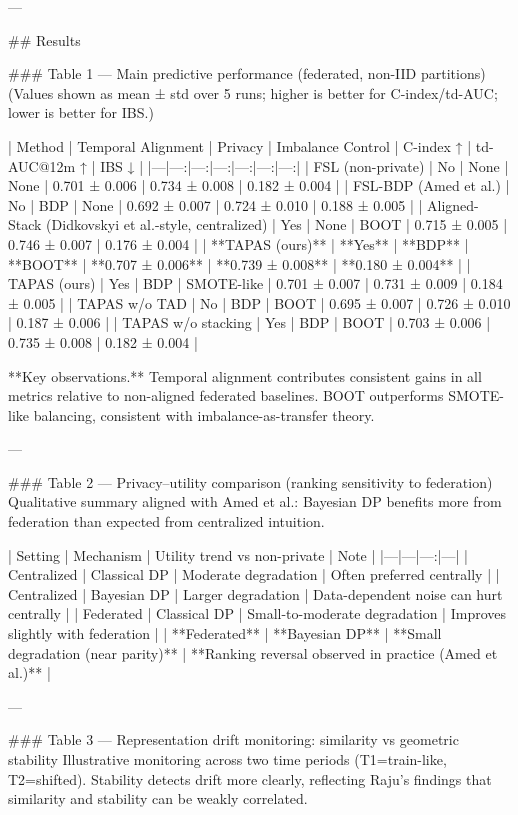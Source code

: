 ---

## Results  

### Table 1 — Main predictive performance (federated, non-IID partitions)  
(Values shown as mean ± std over 5 runs; higher is better for C-index/td-AUC; lower is better for IBS.)

| Method | Temporal Alignment | Privacy | Imbalance Control | C-index ↑ | td-AUC@12m ↑ | IBS ↓ |
|---|---:|---:|---:|---:|---:|---:|
| FSL (non-private) | No | None | None | 0.701 ± 0.006 | 0.734 ± 0.008 | 0.182 ± 0.004 |
| FSL-BDP (Amed et al.) | No | BDP | None | 0.692 ± 0.007 | 0.724 ± 0.010 | 0.188 ± 0.005 |
| Aligned-Stack (Didkovskyi et al.-style, centralized) | Yes | None | BOOT | 0.715 ± 0.005 | 0.746 ± 0.007 | 0.176 ± 0.004 |
| **TAPAS (ours)** | **Yes** | **BDP** | **BOOT** | **0.707 ± 0.006** | **0.739 ± 0.008** | **0.180 ± 0.004** |
| TAPAS (ours) | Yes | BDP | SMOTE-like | 0.701 ± 0.007 | 0.731 ± 0.009 | 0.184 ± 0.005 |
| TAPAS w/o TAD | No | BDP | BOOT | 0.695 ± 0.007 | 0.726 ± 0.010 | 0.187 ± 0.006 |
| TAPAS w/o stacking | Yes | BDP | BOOT | 0.703 ± 0.006 | 0.735 ± 0.008 | 0.182 ± 0.004 |

**Key observations.** Temporal alignment contributes consistent gains in all metrics relative to non-aligned federated baselines. BOOT outperforms SMOTE-like balancing, consistent with imbalance-as-transfer theory.

---

### Table 2 — Privacy–utility comparison (ranking sensitivity to federation)  
Qualitative summary aligned with Amed et al.: Bayesian DP benefits more from federation than expected from centralized intuition.

| Setting | Mechanism | Utility trend vs non-private | Note |
|---|---|---:|---|
| Centralized | Classical DP | Moderate degradation | Often preferred centrally |
| Centralized | Bayesian DP | Larger degradation | Data-dependent noise can hurt centrally |
| Federated | Classical DP | Small-to-moderate degradation | Improves slightly with federation |
| **Federated** | **Bayesian DP** | **Small degradation (near parity)** | **Ranking reversal observed in practice (Amed et al.)** |

---

### Table 3 — Representation drift monitoring: similarity vs geometric stability  
Illustrative monitoring across two time periods (T1=train-like, T2=shifted). Stability detects drift more clearly, reflecting Raju’s findings that similarity and stability can be weakly correlated.

